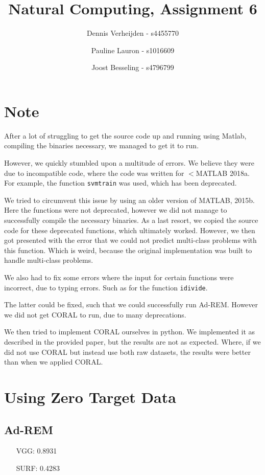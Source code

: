 \documentclass[11pt]{article}
\title{Natural Computing, Assignment 6}
\author{Dennis Verheijden - s4455770 \and Pauline Lauron - s1016609 \and Joost Besseling - s4796799}
\begin{document}
\maketitle

\section*{Note}
After a lot of struggling to get the source code up and running using Matlab, compiling the binaries necessary, we managed to get it to run. 

However, we quickly stumbled upon a multitude of errors. We believe they were due to incompatible code, where the code was written for $<$MATLAB 2018a. For example, the function \texttt{svmtrain} was used, which has been deprecated.

We tried to circumvent this issue by using an older version of MATLAB, 2015b. Here the functions were not deprecated, however we did not manage to successfully compile the necessary binaries. As a last resort, we copied the source code for these deprecated functions, which ultimately worked. However, we then got presented with the error that we could not predict multi-class problems with this function. Which is weird, because the original implementation was built to handle multi-class problems.

We also had to fix some errors where the input for certain functions were incorrect, due to typing errors. Such as for the function \texttt{idivide}.

The latter could be fixed, such that we could successfully run Ad-REM. However we did not get CORAL to run, due to many deprecations.

We then tried to implement CORAL ourselves in python. We implemented it as described in the provided paper, but the results are not as expected. Where, if we did not use CORAL but instead use both raw datasets, the results were better than when we applied CORAL.

\section{Using Zero Target Data}
\subsection{Ad-REM}
\begin{itemize}
	\item[VGG:] 0.8931
	\item[SURF:] 0.4283
\end{itemize}
\end{document}
